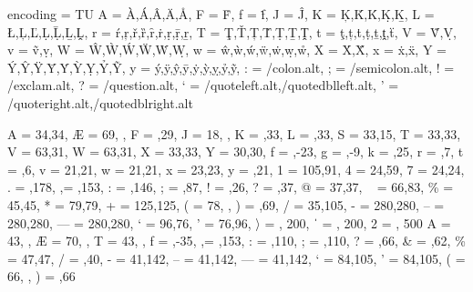 \DeclareCharacterInheritance
   { encoding = {TU} }
   { A = {À,Á,Â,Ä,Å},
     F = {Ḟ},
     f = {ḟ},
     J = {Ĵ},
     K = {Ķ,Ǩ,Ḱ,Ḳ,Ḵ},
     L = {Ł,Ļ,Ľ,Ḷ,Ḹ,Ḻ,Ḽ},
     r = {ŕ,ŗ,ř,ȑ,ȓ,ṙ,ṛ,ṝ,ṟ},
     T = {Ţ,Ť,Ț,Ṫ,Ṭ,Ṯ,Ṱ},
     t = {ţ,ț,ṫ,ṭ,ṯ,ṱ,ẗ},
     V = {Ṽ,Ṿ},
     v = {ṽ,ṿ},
     W = {Ŵ,Ẁ,Ẃ,Ẅ,Ẇ,Ẉ},
     w = {ŵ,ẁ,ẃ,ẅ,ẇ,ẉ,ẘ},
     X = {Ẋ,Ẍ},
     x = {ẋ,ẍ},
     Y = {Ý,Ŷ,Ÿ,Ȳ,Ẏ,Ỳ,Ỵ,Ỷ,Ỹ},
     y = {ý,ÿ,ŷ,ȳ,ẏ,ỳ,ỵ,ỷ,ỹ},
     : = {/colon.alt},
     ; = {/semicolon.alt},
     ! = {/exclam.alt},
     ? = {/question.alt},
     ‘ = {/quoteleft.alt,/quotedblleft.alt},
     ’ = {/quoteright.alt,/quotedblright.alt}
   }

   {
     A = {34,34},
     Æ = {69,  },
     F = {  ,29},
     J = {18,  },
     K = {  ,33},
     L = {  ,33},
     S = {33,15},
     T = {33,33},
     V = {63,31},
     W = {63,31},
     X = {33,33},
     Y = {30,30},
     f = {  ,-23},
     g = {  ,-9},
     k = {  ,25},
     r = {  ,7},
     t = {  ,6},
     v = {21,21},
     w = {21,21},
     x = {23,23},
     y = {  ,21},
     1 = {105,91},
     4 = {24,59},
     7 = {24,24},
     . = { ,178},
    {,}= { ,153},
     : = { ,146},
     ; = { ,87},
     ! = { ,26},
     ? = { ,37},
     @ = {37,37},
     ~ = {66,83},
    \% = {45,45},
     * = {79,79},
     + = {125,125},
     ( = {78,   },
     ) = {   ,69},
     / = {35,105},
     - = {280,280}, %
     –  = {280,280}, %
     — = {280,280}, %
     ‘ = {96,76},
     ’ = {76,96},%
     〉 = { , 200},%
     ˈ = { , 200},%
     2 = { , 500}
   }
   {
     A = {43,  },
     Æ = {70,  },
     T = {43,  },
     f = {  ,-35},
    {,}= { ,153},
     : = { ,110},
     ; = { ,110},
     ? = { ,66},
     & = {  ,62},
    \% = {47,47},
     / = {  ,40},
     - = {41,142}, %
     – = {41,142}, %
     — = {41,142}, %
     ‘ = {84,105},
     ’ = {84,105},
     ( = {66,   },
     ) = {   ,66}
   }
